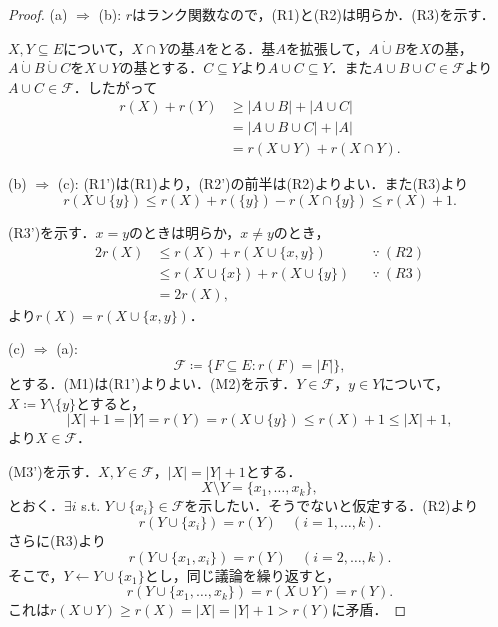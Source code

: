 \documentclass[xelatex,ja=standard,a4paper,14pt,everyparhook=compat]{bxjsarticle}
\newcommand{\dotcup}{\mathbin{\dot\cup}}
\theoremstyle{definition}
\begin{document}
\begin{proof}
    (a) $\Longrightarrow$ (b): $r$はランク関数なので，(R1)と(R2)は明らか．(R3)を示す．

    $X, Y \subseteq E$について，$X \cap Y$の基$A$をとる．基$A$を拡張して，$A \dotcup B$を$X$の基，$A \dotcup B \dotcup C$を$X \cup Y$の基とする．$C \subseteq Y$より$A \cup C \subseteq Y$．また$A \cup B \cup C \in \mathcal{F}$より$A \cup C \in \mathcal{F}$．したがって \begin{align*}
        r(X) + r(Y)
         & \geq |A \cup B| + |A \cup C| \\
         & = |A \cup B \cup C| + |A|    \\
         & = r(X \cup Y) + r(X \cap Y).
    \end{align*}

    (b) $\Longrightarrow$ (c): (R1')は(R1)より，(R2')の前半は(R2)よりよい．また(R3)より \begin{equation*}
        r(X \cup \{y\}) \leq r(X) + r(\{y\}) - r(X \cap \{y\}) \leq r(X) + 1.
    \end{equation*}

    \newpage

    (R3')を示す．$x = y$のときは明らか，$x \neq y$のとき， \begin{align*}
        2r(X) & \leq r(X) + r(X \cup \{x, y\})         &  & \because \ (R2) \\
              & \leq r(X \cup \{x\}) + r(X \cup \{y\}) &  & \because \ (R3) \\
              & = 2r(X),
    \end{align*}
    より$r(X) = r(X \cup \{x,y\})$．

    (c) $\Longrightarrow$ (a): \begin{equation*}
        \mathcal{F} \coloneqq \{F \subseteq E : r(F) = |F|\},
    \end{equation*}
    とする．(M1)は(R1')よりよい．(M2)を示す．$Y \in \mathcal{F}$，$y \in Y$について，$X \coloneqq Y \setminus \{y\}$とすると， \begin{equation*}
        |X| + 1 = |Y| = r(Y) = r(X \cup \{y\}) \leq r(X) + 1 \leq |X| + 1,
    \end{equation*}
    より$X \in \mathcal{F}$．

    (M3')を示す．$X, Y \in \mathcal{F}$，$|X| = |Y| + 1$とする．\begin{equation*}
        X \setminus Y = \{x_1, \ldots, x_k\},
    \end{equation*}
    とおく．$\exists i$ s.t. $Y \cup \{x_i\} \in \mathcal{F}$を示したい．そうでないと仮定する．(R2)より \begin{equation*}
        r(Y \cup \{x_i\}) = r(Y) \quad (i = 1, \ldots, k).
    \end{equation*}
    さらに(R3)より \begin{equation*}
        r(Y \cup \{x_1, x_i\}) = r(Y) \quad (i = 2, \ldots, k).
    \end{equation*}
    そこで，$Y \gets Y \cup \{x_1\}$とし，同じ議論を繰り返すと， \begin{equation*}
        r(Y \cup \{x_1, \ldots, x_k\}) = r(X \cup Y) = r(Y).
    \end{equation*}
    これは$r(X \cup Y) \geq r(X) = |X| = |Y| + 1 > r(Y)$に矛盾．


\end{proof}
\end{document}
